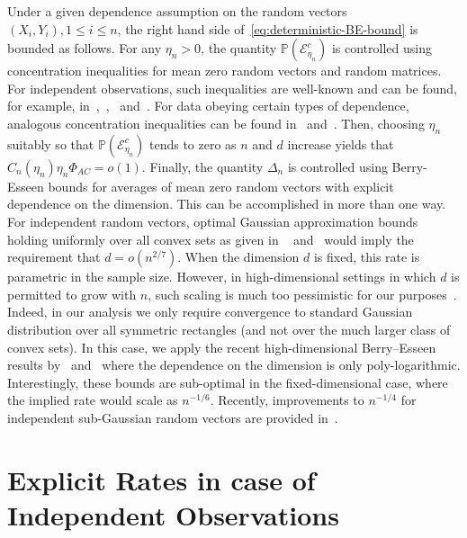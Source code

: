\documentclass{article}
\begin{document}
 Under a given dependence assumption on the random vectors $(X_i, Y_i), 1\le i\le n$, the right hand side of~\eqref{eq:deterministic-BE-bound} is bounded as follows. For any $\eta_n > 0$, the quantity $\mathbb{P}(\mathcal{E}_{\eta_n}^c)$ is controlled using concentration inequalities for mean zero random vectors and random matrices. For independent observations, such  inequalities are well-known and can be found, for example, in~\cite{LED91},~\cite{einmahl2008characterization},~\cite{Ver12,Vershynin18} and~\cite{tropp2016expected}. For data obeying certain types of dependence, analogous concentration inequalities can be found in~\cite{Liu13} and~\citet{Uniform:Kuch18}. Then, choosing $\eta_n$ suitably so that $\mathbb{P}(\mathcal{E}_{\eta_n}^c)$ tends to zero as $n$ and $d$ increase yields that $C_n(\eta_n)\eta_n\Phi_{AC} = o(1)$. Finally, the quantity $\Delta_n$ is controlled using Berry-Esseen bounds for averages of mean zero random vectors with explicit dependence on the dimension. This can be accomplished in more than one way. For independent random vectors, optimal Gaussian approximation bounds holding uniformly over all convex sets as given in ~\cite{bentkus2003dependence} and~\cite{raivc2019multivariate} would imply the requirement that $d = o(n^{2/7})$. When the dimension $d$ is fixed, this rate is parametric in the sample size. However, in high-dimensional settings in which $d$ is permitted to grow with $n$, such scaling is much too pessimistic for our purposes~\citep{MR1115160}. Indeed, in our analysis we only require convergence to standard Gaussian distribution over all symmetric rectangles (and not over the much larger class of convex sets). In this case, we apply the recent high-dimensional Berry--Esseen results by~\cite{Chern17} and~\cite{koike2019notes} \citep{ZhangWu17} where the dependence on the dimension is only poly-logarithmic. Interestingly, these bounds are sub-optimal in the fixed-dimensional case, where the implied rate would scale as $n^{-1/6}$. Recently, improvements to $n^{-1/4}$ for independent sub-Gaussian random vectors are provided in~\cite{chernozhukov2019improved}. 
 
 
 
 
 
 
 
 \section{Explicit Rates in case of Independent Observations}
 \label{section::explicit}
 
\end{document}
